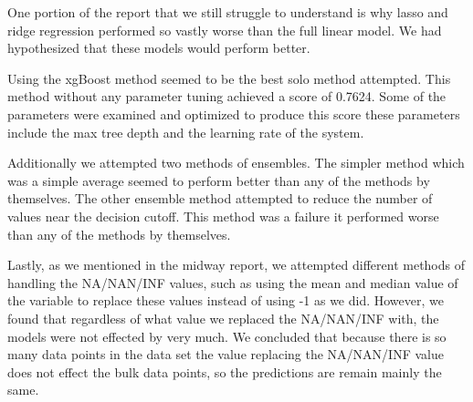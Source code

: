 \documentclass[aps, reprint, groupedaddress, superscriptaddress, amsmath, 10pt]{revtex4-1}
\begin{document}
	One portion of the report that we still struggle to understand is why lasso and ridge regression performed so vastly worse than the full linear model.  We had hypothesized that these models would perform better.  
	
	Using the xgBoost method seemed to be the best solo method attempted.  This method without any parameter tuning achieved a score of 0.7624.  Some of the parameters were examined and optimized to produce this score these parameters include the max tree depth and the learning rate of the system. 
	
	Additionally we attempted two methods of ensembles.  The simpler method which was a simple average seemed to perform better than any of the methods by themselves. The other ensemble method attempted to reduce the number of values near the decision cutoff.  This method was a failure it performed worse than any of the methods by themselves. 
	
	Lastly, as we mentioned in the midway report, we attempted different methods of handling the NA/NAN/INF values, such as using the mean and median value of the variable to replace these values instead of using -1 as we did.  However, we found that regardless of what value we replaced the NA/NAN/INF with, the models were not effected by very much.  We concluded that because there is so many data points in the data set the value replacing the NA/NAN/INF value does not effect the bulk data points, so the predictions are remain mainly the same.
	
	
	
\end{document}
